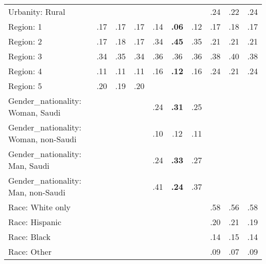 \begin{tabular}[t]{lccccccccc}
Urbanity: Rural &  &  &  &  &  &  & .24 & .22 & .24\\
\addlinespace
Region: 1 & .17 & .17 & .17 & .14 & \textbf{.06} & .12 & .17 & .18 & .17\\
Region: 2 & .17 & .18 & .17 & .34 & \textbf{.45} & .35 & .21 & .21 & .21\\
Region: 3 & .34 & .35 & .34 & .36 & .36 & .36 & .38 & .40 & .38\\
Region: 4 & .11 & .11 & .11 & .16 & \textbf{.12} & .16 & .24 & .21 & .24\\
Region: 5 & .20 & .19 & .20 &  &  &  &  &  & \\
\addlinespace
Gender\_nationality: Woman, Saudi &  &  &  & .24 & \textbf{.31} & .25 &  &  & \\
Gender\_nationality: Woman, non-Saudi &  &  &  & .10 & .12 & .11 &  &  & \\
Gender\_nationality: Man, Saudi &  &  &  & .24 & \textbf{.33} & .27 &  &  & \\
Gender\_nationality: Man, non-Saudi &  &  &  & .41 & \textbf{.24} & .37 &  &  & \\
\addlinespace
Race: White only &  &  &  &  &  &  & .58 & .56 & .58\\
Race: Hispanic &  &  &  &  &  &  & .20 & .21 & .19\\
Race: Black &  &  &  &  &  &  & .14 & .15 & .14\\
Race: Other &  &  &  &  &  &  & .09 & .07 & .09\\
\bottomrule
\end{tabular}